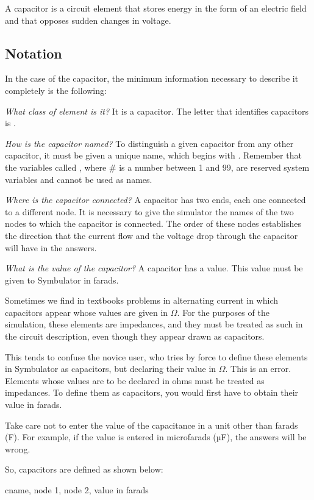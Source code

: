 A capacitor is a circuit element that stores energy in the form of
an electric field and that opposes sudden changes in voltage.

\subsection{Notation}

In the case of the capacitor, the minimum information necessary to
describe it completely is the following:

\emph{What class of element is it?} It is a capacitor. The letter
that identifies capacitors is .

\emph{How is the capacitor named?} To distinguish a given capacitor
from any other capacitor, it must be given a unique name, which
begins with . Remember that the variables called ,
where \# is a number between 1 and 99, are reserved system variables
and cannot be used as names.

\emph{Where is the capacitor connected?} A capacitor has two ends,
each one connected to a different node. It is necessary to give the
simulator the names of the two nodes to which the capacitor is
connected. The order of these nodes establishes the direction that
the current flow and the voltage drop through the capacitor will
have in the answers.

\emph{What is the value of the capacitor?} A capacitor has a value.
This value must be given to Symbulator in farads.

Sometimes we find in textbooks problems in alternating current in
which capacitors appear whose values are given in $\Omega$. For the
purposes of the simulation, these elements are impedances, and they
must be treated as such in the circuit description, even though they
appear drawn as capacitors.

This tends to confuse the novice user, who tries by force to define
these elements in Symbulator as capacitors, but declaring their
value in $\Omega$. This is an error. Elements whose values are to be
declared in ohms must be treated as impedances. To define them as
capacitors, you would first have to obtain their value in farads.

Take care not to enter the value of the capacitance in a unit other
than farads (F). For example, if the value is entered in microfarads
(µF), the answers will be wrong.

So, capacitors are defined as shown below:

\begin{entry}
cname, node 1, node 2, value in farads
\end{entry}

